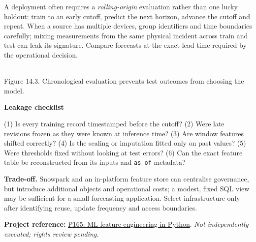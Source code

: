 \documentclass[11pt,twoside]{article}
\newcommand{\repo}[2]{\par\begingroup\fontsize{8.0}{9.6}\selectfont\sffamily\color{inkgray}\textbf{Project reference:} \href{#2}{#1}. \textit{Not independently executed; rights review pending.}\par\endgroup}
\begin{document}
A deployment often requires a \emph{rolling-origin} evaluation rather than one lucky holdout: train to an early cutoff, predict the next horizon, advance the cutoff and repeat. When a source has multiple devices, group identifiers and time boundaries carefully; mixing measurements from the same physical incident across train and test can leak its signature. Compare forecasts at the exact lead time required by the operational decision.
\begin{center}\\{\fontsize{8}{9}\selectfont\color{inkgray}Figure 14.3. Chronological evaluation prevents test outcomes from choosing the model.}\end{center}
\begin{whitebox}\textbf{Leakage checklist}\par
(1) Is every training record timestamped before the cutoff? (2) Were late revisions frozen as they were known at inference time? (3) Are window features shifted correctly? (4) Is the scaling or imputation fitted only on past values? (5) Were thresholds fixed without looking at test errors? (6) Can the exact feature table be reconstructed from its inputs and \texttt{as\_of} metadata?
\end{whitebox}
\textbf{Trade-off.} Snowpark and an in-platform feature store can centralise governance, but introduce additional objects and operational costs; a modest, fixed SQL view may be sufficient for a small forecasting application. Select infrastructure only after identifying reuse, update frequency and access boundaries.
\repo{P165: ML feature engineering in Python}{https://github.com/Snowflake-Labs/sfguide-intro-to-machine-learning-with-snowflake-ml-for-python}

\newpage

\end{document}
